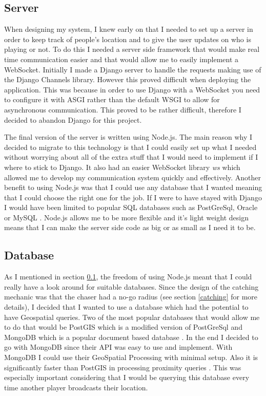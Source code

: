 \documentclass{l4proj}
\begin{document}
\subsection{Server}
\label{implementationServer}
When designing my system, I knew early on that I needed to set up a server in order to keep track of people's location
and to give the user updates on who is playing or not. To do this I needed a server side framework that would make real
time communication easier and that would allow me to easily implement a WebSocket. Initially I made a Django server to
handle the requests making use of the Django Channels library. However this proved difficult when deploying the application.
This was because in order to use Django with a WebSocket you need to configure it with ASGI rather than the default WSGI
to allow for asynchronous communication. This proved to be rather difficult, therefore I decided to abandon Django for this
project.

The final version of the server is written using Node.js. The main reason why I decided to migrate to this technology is that
I could easily set up what I needed without worrying about all of the extra stuff that I would need to implement if I where to
stick to Django. It also had an easier WebSocket library \emph{ws} which allowed me to develop my communication system quickly
and effectively. Another benefit to using Node.js was that I could use any database that I wanted meaning that I could
choose the right one for the job. If I were to have stayed with Django I would have been limited to popular SQL databases
such as PostGreSql, Oracle or MySQL \citep{djangoDatabases}. Node.js allows me to be more flexible and it's light weight
design means that I can make the server side code as big or as small as I need it to be.

\subsection{Database}
\label{implementationDatabase}
As I mentioned in section \ref{implementationServer}, the freedom of using Node.js meant that I could really have a look
around for suitable databases. Since the design of the catching mechanic was that the chaser had a no-go radius (see section
\ref{catching} for more details), I decided that I wanted to use a database which had the potential to have Geospatial queries.
Two of the most popular databases that would allow me to do that would be PostGIS which is a modified version of PostGreSql \citep{postgis, postgres} and
MongoDB which is a popular document based database \citep{mongodb}. In the end I decided to go with MongoDB since their API
was easy to use and implement. With MongoDB I could use their GeoSpatial Processing with minimal setup. Also it is significantly
faster than PostGIS in processing proximity queries \citep{Bartoszewski2019}. This was especially important considering
that I would be querying this database every time another player broadcasts their location.
\end{document}

